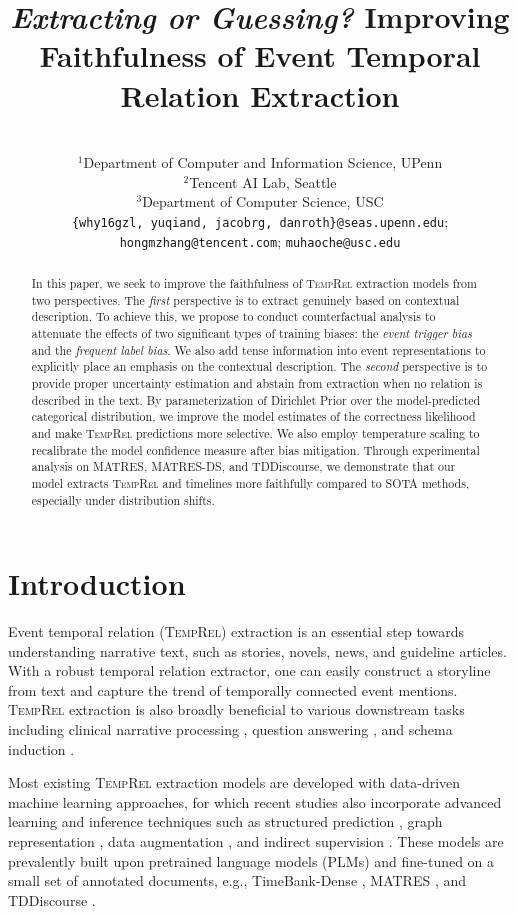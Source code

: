 \documentclass[11pt]{article}
\title{\emph{Extracting or Guessing?} Improving Faithfulness of Event Temporal Relation Extraction}
\author{\makecell{Haoyu Wang$^1$, Hongming Zhang$^2$, Yuqian Deng$^1$, \\Jacob R. Gardner$^1$,   Dan Roth$^1$ \& Muhao Chen$^{3}$}\\
$^1$Department of Computer and Information Science, UPenn\\
$^2$Tencent AI Lab, Seattle\\
$^3$Department of Computer Science, USC\\
\texttt{\{why16gzl, yuqiand, jacobrg, danroth\}@seas.upenn.edu};\\ \texttt{hongmzhang@tencent.com};
\texttt{muhaoche@usc.edu}\\
}
\newcommand{\temprel}{\textsc{TempRel}\xspace}
\begin{document}
\maketitle
\begin{abstract}
In this paper, we seek to improve the faithfulness of \temprel extraction models from two perspectives.
The \textit{first} perspective is to extract genuinely based on contextual description. 
To achieve this, we propose to conduct counterfactual analysis to attenuate the effects of two significant types of training biases: the \textit{event trigger bias} and the \textit{frequent label bias}.
We also add tense information into event  representations to explicitly place an emphasis on the contextual description.
The \textit{second} perspective is to provide proper uncertainty estimation and abstain from extraction when no relation is described in the text.
By parameterization of Dirichlet Prior over the model-predicted categorical distribution, we improve the model estimates of the correctness likelihood and make \temprel predictions more selective.
We also employ temperature scaling to recalibrate the model confidence measure after bias mitigation.
Through experimental analysis on MATRES, MATRES-DS, and TDDiscourse, we demonstrate that our model extracts \temprel and timelines more faithfully compared to SOTA methods, especially under distribution shifts.
\end{abstract}

\section{Introduction}
\label{sec:intro}
Event temporal relation (\temprel) extraction is an essential step towards understanding narrative text, such as stories, novels, news, and guideline articles. 
With a robust temporal relation extractor, one can easily construct a storyline from text and capture the trend of temporally connected event mentions. 
\temprel extraction is also broadly beneficial to various downstream tasks including clinical narrative processing \cite{jindal-roth-2013-using, bethard-etal-2016-semeval}, question answering \cite{llorens-etal-2015-semeval, meng-etal-2017-temporal, stricker-2021-question-answering}, and schema induction \cite{chambers-jurafsky-2009-unsupervised, wen-etal-2021-resin, li-etal-2021-future}.

Most existing \temprel extraction models are developed with data-driven machine learning approaches, for which recent studies also incorporate advanced learning and inference techniques such as structured prediction \cite{ning-etal-2017-structured,ning-etal-2018-improving,han-etal-2019-joint,wang-etal-2020-joint,tan-etal-2021-extracting}, graph representation \cite{mathur-etal-2021-timers, qiang-naacl-2022}, data augmentation \cite{ballesteros-etal-2020-severing,trong2022selecting}, and indirect supervision \cite{zhao-etal-2021-effective, zhou-etal-2021-temporal}.
These models are prevalently built upon pretrained language models (PLMs) and fine-tuned on a small set of annotated documents, e.g., TimeBank-Dense \cite{cassidy-etal-2014-annotation}, MATRES \cite{ning-etal-2018-multi}, and TDDiscourse \cite{naik-etal-2019-tddiscourse}.
\end{document}
